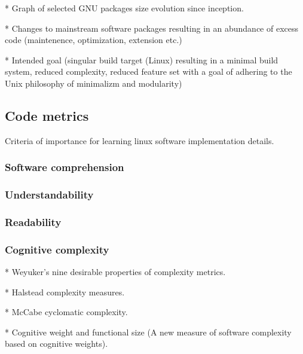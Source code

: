 * Graph of selected GNU packages size evolution since inception.

* Changes to mainstream software packages resulting in an abundance of excess code (maintenence, optimization, extension etc.)

* Intended goal (singular build target (Linux) resulting in a minimal build system, reduced complexity, reduced feature set with a goal of adhering to the Unix philosophy of minimalizm and modularity)


\subsection{Code metrics}

Criteria of importance for learning linux software implementation details.

\subsubsection{Software comprehension}

\subsubsection{Understandability}

\subsubsection{Readability}

\subsubsection{Cognitive complexity}

* Weyuker's nine desirable properties of complexity metrics.

* Halstead complexity measures.

* McCabe cyclomatic complexity.

* Cognitive weight and functional size (A new measure of software complexity based on cognitive weights).
